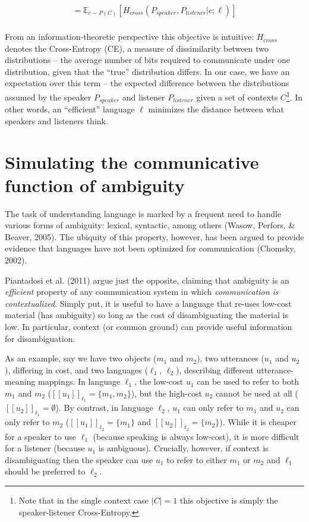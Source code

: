\documentclass[10pt, letterpaper]{article}
\begin{document}
\begin{equation}
\begin{split}
  = \mathbb{E}_{c \sim P(C)}[H_{cross}(P_{speaker}, P_{listener} | c; \ell)]\\
\end{split}
\end{equation}

From an information-theoretic perspective this objective is intuitive:
\(H_{cross}\) denotes the Cross-Entropy (CE), a measure of dissimilarity
between two distributions -- the average number of bits required to
communicate under one distribution, given that the ``true'' distribution
differs. In our case, we have an expectation over this term -- the
expected difference between the distributions assumed by the speaker
\(P_{speaker}\) and listener \(P_{listener}\) given a set of contexts
\(C\)\footnote{Note that in the single context case $|C|=1$ this objective is simply the speaker-listener Cross-Entropy.}.
In other words, an ``efficient'' language \(\ell\) minimizes the
distance between what speakers and listeners think.

\section{Simulating the communicative function of
ambiguity}\label{simulating-the-communicative-function-of-ambiguity}

The task of understanding language is marked by a frequent need to
handle various forms of ambiguity: lexical, syntactic, among others
(Wasow, Perfors, \& Beaver, 2005). The ubiquity of this property,
however, has been argued to provide evidence that languages have not
been optimized for communication (Chomsky, 2002).

Piantadosi et al. (2011) argue just the opposite, claiming that
ambiguity is an \emph{efficient} property of any communication system in
which \emph{communication is contextualized}. Simply put, it is useful
to have a language that re-uses low-cost material (has ambiguity) so
long as the cost of disambiguating the material is low. In particular,
context (or common ground) can provide useful information for
disambiguation.\par

As an example, say we have two objects (\(m_1\) and \(m_2\)), two
utterances (\(u_1\) and \(u_2\)), differing in cost, and two languages
(\(\ell_1\), \(\ell_2\)), describing different utterance-meaning
mappings. In language \(\ell_1\), the low-cost \(u_1\) can be used to
refer to both \(m_1\) and \(m_2\)
(\([[u_1]]_{\ell_1} = \{m_1, m_2 \}\)), but the high-cost \(u_2\) cannot
be used at all (\([[u_2]]_{\ell_1} = \emptyset\)). By contrast, in
language \(\ell_2\), \(u_1\) can only refer to \(m_1\) and \(u_2\) can
only refer to \(m_2\) (\([[u_1]]_{\ell_2} = \{m_1\}\) and
\([[u_2]]_{\ell_2} = \{m_2 \}\)). While it is cheaper for a speaker to
use \(\ell_1\) (because speaking is always low-cost), it is more
difficult for a listener (because \(u_1\) is ambiguous). Crucially,
however, if context is disambiguating then the speaker can use \(u_1\)
to refer to either \(m_1\) or \(m_2\) and \(\ell_1\) should be preferred
to \(\ell_2\).\par
\end{document}
